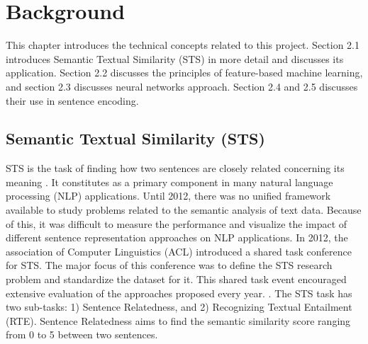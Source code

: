 \documentclass[12pt]{report} %
\begin{document}
	

\chapter{Background}
This chapter introduces the technical concepts related to this project. Section 2.1 introduces Semantic Textual Similarity (STS) in
more detail and discusses its application. Section 2.2 discusses the
principles of feature-based machine learning, and section 2.3 discusses neural networks approach. Section 2.4 and 2.5 discusses their use in sentence encoding.


\section{Semantic Textual Similarity (STS)}

     STS is the task of finding how two sentences are closely related concerning its meaning \citep{agirre2012semeval}. It constitutes as a primary component in many natural language processing (NLP) applications. Until 2012, there was no unified framework available to study problems related to the semantic analysis of text data. Because of this, it was difficult to measure the performance and visualize the impact of different sentence representation approaches on NLP applications. In 2012, the association of Computer Linguistics (ACL) introduced a shared task conference for STS. The major focus of this conference was to define the STS research problem and standardize the dataset for it. This shared task event encouraged extensive evaluation of the approaches proposed every year. \citep{agirre2012semeval}. The STS task has two sub-tasks: 1) Sentence Relatedness, and 2) Recognizing Textual Entailment (RTE). Sentence Relatedness aims to find the semantic similarity score ranging from 0 to 5 between two sentences. 
    
\end{document}
